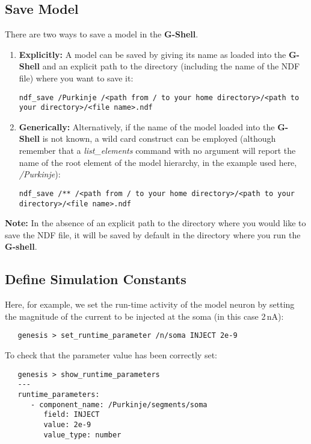 \documentclass[12pt]{article}
\begin{document}
\subsection*{Save Model}

There are two ways to save a model in the {\bf G-Shell}.

\begin{enumerate}
   \item{\bf Explicitly:} A model can be saved by giving its name as loaded into the {\bf G-Shell} and an explicit path to the directory (including the name of the NDF file) where you want to save it:
   \begin{verbatim}
ndf_save /Purkinje /<path from / to your home directory>/<path to your directory>/<file name>.ndf
   \end{verbatim}
   \item{\bf Generically:} Alternatively, if the name of the model loaded into the {\bf G-Shell} is not known, a wild card construct can be employed (although remember that a {\it list\_elements} command with no argument will report the name of the root element of the model hierarchy, in the example used here, {\it /Purkinje}):
   \begin{verbatim}
ndf_save /** /<path from / to your home directory>/<path to your directory>/<file name>.ndf
   \end{verbatim}   
\end{enumerate}
{\bf Note:} In the absence of an explicit path to the directory where you would like to save the NDF file, it will be saved by default in the directory where you run the {\bf G-shell}.

\subsection*{Define Simulation Constants}

Here, for example, we set the run-time activity of the model neuron by 
setting the magnitude of the current to be injected at the soma (in this case 2\,nA):
\begin{verbatim}
   genesis > set_runtime_parameter /n/soma INJECT 2e-9
\end{verbatim}
To check that the parameter value has been correctly set:
\begin{verbatim}
   genesis > show_runtime_parameters
   ---
   runtime_parameters:
      - component_name: /Purkinje/segments/soma
         field: INJECT
         value: 2e-9
         value_type: number
\end{verbatim}  
\end{document}
